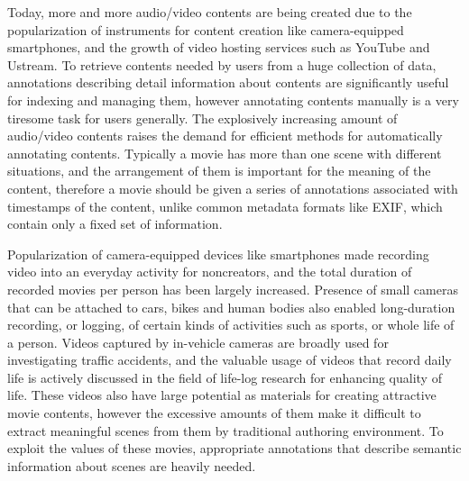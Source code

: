 Today, more and more audio/video contents are being created due to the popularization of instruments for content creation like camera-equipped smartphones, and the growth of video hosting services such as YouTube and Ustream.
To retrieve contents needed by users from a huge collection of data, annotations describing detail information about contents are significantly useful for indexing and managing them, however annotating contents manually is a very tiresome task for users generally.
The explosively increasing amount of audio/video contents raises the demand for efficient methods for automatically annotating contents.
Typically a movie has more than one scene with different situations, and the arrangement of them is important for the meaning of the content, therefore a movie should be given a series of annotations associated with timestamps of the content, unlike common metadata formats like EXIF, which contain only a fixed set of information.

Popularization of camera-equipped devices like smartphones made recording video into an everyday activity for noncreators, and the total duration of recorded movies per person has been largely increased.
Presence of small cameras that can be attached to cars, bikes and human bodies also enabled long-duration recording, or logging, of certain kinds of activities such as sports, or whole life of a person.
Videos captured by in-vehicle cameras are broadly used for investigating traffic accidents, and the valuable usage of videos that record daily life is actively discussed in the field of life-log research for enhancing quality of life.
These videos also have large potential as materials for creating attractive movie contents, however the excessive amounts of them make it difficult to extract meaningful scenes from them by traditional authoring environment.
To exploit the values of these movies, appropriate annotations that describe semantic information about scenes are heavily needed.

